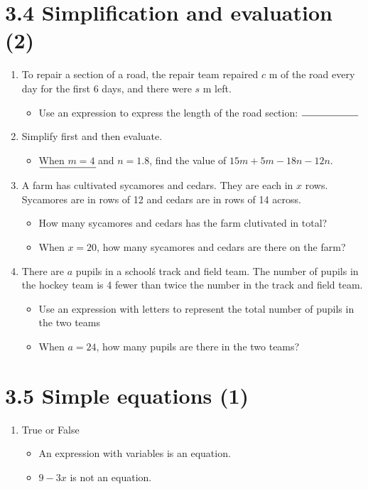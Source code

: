 \documentclass{article}%
\begin{document}
%
\section*{3.4 Simplification and evaluation (2)}%
\begin{enumerate}%
\item%
To repair a section of a road, the repair team repaired $c$ m of the road every day for the first 6 days, and there were $s$ m left.%
\begin{itemize}%
\item%
Use an expression to express the length of the road section: $\rule{2cm}{0.15mm}$%
\end{itemize}%
\item%
Simplify first and then evaluate.%
\begin{itemize}%
\item%
When $m=4$ and $n=1.8$, find the value of $15m+5m-18n-12n$. $\rule{2cm}{0.15mm}$%
\end{itemize}%
\item%
A farm has cultivated sycamores and cedars. They are each in $x$ rows. Sycamores are in rows of 12 and cedars are in rows of 14 across.%
\begin{itemize}%
\item%
How many sycamores and cedars has the farm clutivated in total?%
\item%
When $x=20$, how many sycamores and cedars are there on the farm?%
\end{itemize}%
\item%
There are $a$ pupils in a school\'s track and field team. The number of pupils in the hockey team is 4 fewer than twice the number in the track and field team.%
\begin{itemize}%
\item%
Use an expression with letters to represent the total number of pupils in the two teams%
\item%
When $a=24$, how many pupils are there in the two teams?%
\end{itemize}%
\end{enumerate}

%
\section*{3.5 Simple equations (1)}%
\begin{enumerate}%
\item%
True or False%
\begin{itemize}%
\item%
An expression with variables is an equation.%
\item%
$9-3x$ is not an equation.%
\end{itemize}%
\end{enumerate}
\end{document}
